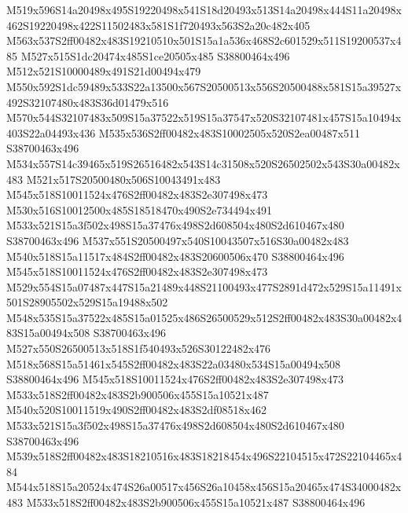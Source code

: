 \documentclass{article}
\begin{document}
\begin{multicols}{2}
M519x596S14a20498x495S19220498x541S18d20493x513S14a20498x444S11a20498x462S19220498x422S11502483x581S1f720493x563S2a20c482x405 M563x537S2ff00482x483S19210510x501S15a1a536x468S2c601529x511S19200537x485 M527x515S1dc20474x485S1ce20505x485 S38800464x496 M512x521S10000489x491S21d00494x479 M550x592S1dc59489x533S22a13500x567S20500513x556S20500488x581S15a39527x492S32107480x483S36d01479x516 M570x544S32107483x509S15a37522x519S15a37547x520S32107481x457S15a10494x403S22a04493x436 M535x536S2ff00482x483S10002505x520S2ea00487x511 S38700463x496 M534x557S14c39465x519S26516482x543S14c31508x520S26502502x543S30a00482x483 M521x517S20500480x506S10043491x483 M545x518S10011524x476S2ff00482x483S2e307498x473 M530x516S10012500x485S18518470x490S2e734494x491 M533x521S15a3f502x498S15a37476x498S2d608504x480S2d610467x480 S38700463x496 M537x551S20500497x540S10043507x516S30a00482x483 M540x518S15a11517x484S2ff00482x483S20600506x470 S38800464x496 M545x518S10011524x476S2ff00482x483S2e307498x473 M529x554S15a07487x447S15a21489x448S21100493x477S2891d472x529S15a11491x501S28905502x529S15a19488x502 M548x535S15a37522x485S15a01525x486S26500529x512S2ff00482x483S30a00482x483S15a00494x508 S38700463x496 M527x550S26500513x518S1f540493x526S30122482x476 M518x568S15a51461x545S2ff00482x483S22a03480x534S15a00494x508 S38800464x496 M545x518S10011524x476S2ff00482x483S2e307498x473 M533x518S2ff00482x483S2b900506x455S15a10521x487 M540x520S10011519x490S2ff00482x483S2df08518x462 M533x521S15a3f502x498S15a37476x498S2d608504x480S2d610467x480 S38700463x496 M539x518S2ff00482x483S18210516x483S18218454x496S22104515x472S22104465x484 M544x518S15a20524x474S26a00517x456S26a10458x456S15a20465x474S34000482x483 M533x518S2ff00482x483S2b900506x455S15a10521x487 S38800464x496






\end{multicols}
\end{document}
